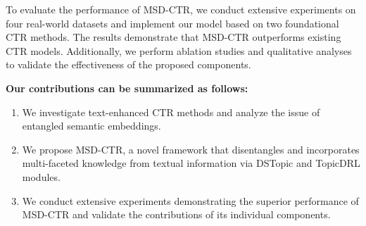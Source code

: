 To evaluate the performance of MSD-CTR, we conduct extensive experiments on four real-world datasets and implement our model based on two foundational CTR methods. The results demonstrate that MSD-CTR outperforms existing CTR models. Additionally, we perform ablation studies and qualitative analyses to validate the effectiveness of the proposed components.

\textbf{Our contributions can be summarized as follows:}
\begin{enumerate}
    \item We investigate text-enhanced CTR methods and analyze the issue of entangled semantic embeddings.
    \item We propose MSD-CTR, a novel framework that disentangles and incorporates multi-faceted knowledge from textual information via DSTopic and TopicDRL modules.
    \item We conduct extensive experiments demonstrating the superior performance of MSD-CTR and validate the contributions of its individual components.
\end{enumerate}


